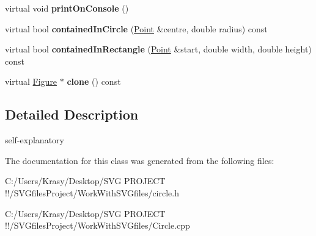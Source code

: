 \begin{DoxyCompactItemize}
virtual void {\bfseries print\+On\+Console} ()
\item 
\mbox{\label{class_circle_a4fdb9c759babe7b045644cedd3ed3696}} 
virtual bool {\bfseries contained\+In\+Circle} (\mbox{\hyperlink{struct_point}{Point}} \&centre, double radius) const
\item 
\mbox{\label{class_circle_aa5aa599667e4de920c8b1c26560b22ad}} 
virtual bool {\bfseries contained\+In\+Rectangle} (\mbox{\hyperlink{struct_point}{Point}} \&start, double width, double height) const
\item 
\mbox{\label{class_circle_a78124b468989fa4deb88cfa34ce99625}} 
virtual \mbox{\hyperlink{class_figure}{Figure}} $\ast$ {\bfseries clone} () const
\end{DoxyCompactItemize}


\subsection{Detailed Description}
self-\/explanatory 

The documentation for this class was generated from the following files\+:\begin{DoxyCompactItemize}
\item 
C\+:/\+Users/\+Krasy/\+Desktop/\+S\+V\+G P\+R\+O\+J\+E\+C\+T !!/\+S\+V\+Gfiles\+Project/\+Work\+With\+S\+V\+Gfiles/circle.\+h\item 
C\+:/\+Users/\+Krasy/\+Desktop/\+S\+V\+G P\+R\+O\+J\+E\+C\+T !!/\+S\+V\+Gfiles\+Project/\+Work\+With\+S\+V\+Gfiles/Circle.\+cpp\end{DoxyCompactItemize}
